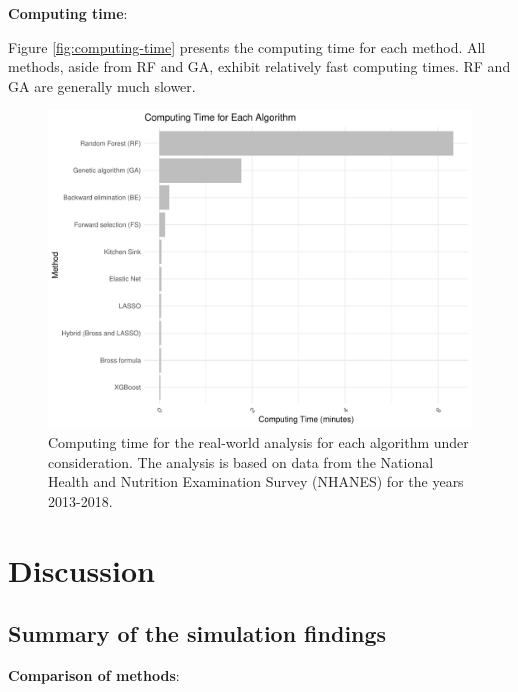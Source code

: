 \documentclass[sn-vancouver,Numbered,lineno,pdflatex]{sn-jnl}
\begin{document}
\textbf{Computing time}:

Figure \ref{fig:computing-time} presents the computing time for each
method. All methods, aside from RF and GA, exhibit relatively fast
computing times. RF and GA are generally much slower.

\begin{figure}[th]

{\centering \includegraphics[width=1\linewidth,]{manuscript_files/figure-latex/unnamed-chunk-4-1} 

}

\caption{Computing time for the real-world analysis for each algorithm under consideration. The analysis is based on data from the National Health and Nutrition Examination Survey (NHANES) for the years 2013-2018.\label{fig:computing-time}}\label{fig:unnamed-chunk-4}
\end{figure}

\section{Discussion}\label{discussion}

\subsection{Summary of the simulation
findings}\label{summary-of-the-simulation-findings}

\textbf{Comparison of methods}:
\end{document}
